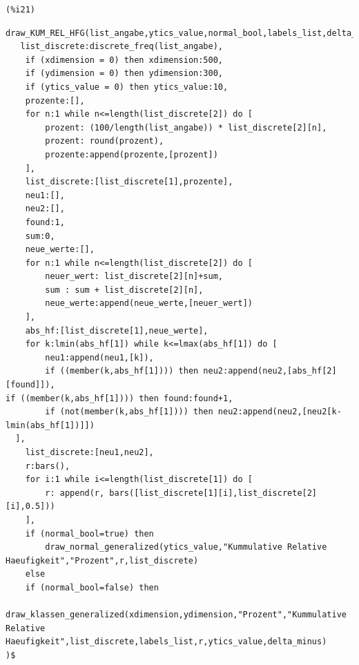 \documentclass[12pt]{article}
\begin{document}
\noindent
\begin{minipage}[t]{8ex}{\color{red}\bf
\begin{verbatim}
(%i21) 
\end{verbatim}}
\end{minipage}
\begin{minipage}[t]{\textwidth}{\color{blue}
\begin{verbatim}
draw_KUM_REL_HFG(list_angabe,ytics_value,normal_bool,labels_list,delta_minus,xdimension,ydimension):=block(
   list_discrete:discrete_freq(list_angabe),
    if (xdimension = 0) then xdimension:500,
    if (ydimension = 0) then ydimension:300,
    if (ytics_value = 0) then ytics_value:10,
    prozente:[],
    for n:1 while n<=length(list_discrete[2]) do [
        prozent: (100/length(list_angabe)) * list_discrete[2][n],
        prozent: round(prozent),
        prozente:append(prozente,[prozent])
    ],
    list_discrete:[list_discrete[1],prozente],
    neu1:[],
    neu2:[],
    found:1,
    sum:0,
    neue_werte:[],
    for n:1 while n<=length(list_discrete[2]) do [
        neuer_wert: list_discrete[2][n]+sum,
        sum : sum + list_discrete[2][n],
        neue_werte:append(neue_werte,[neuer_wert])
    ],
    abs_hf:[list_discrete[1],neue_werte],
    for k:lmin(abs_hf[1]) while k<=lmax(abs_hf[1]) do [
        neu1:append(neu1,[k]),
        if ((member(k,abs_hf[1]))) then neu2:append(neu2,[abs_hf[2][found]]),
if ((member(k,abs_hf[1]))) then found:found+1,
        if (not(member(k,abs_hf[1]))) then neu2:append(neu2,[neu2[k-lmin(abs_hf[1])]])
  ],  
    list_discrete:[neu1,neu2],
    r:bars(),
    for i:1 while i<=length(list_discrete[1]) do [
        r: append(r, bars([list_discrete[1][i],list_discrete[2][i],0.5]))
    ],
    if (normal_bool=true) then
        draw_normal_generalized(ytics_value,"Kummulative Relative Haeufigkeit","Prozent",r,list_discrete)
    else
    if (normal_bool=false) then
        draw_klassen_generalized(xdimension,ydimension,"Prozent","Kummulative Relative Haeufigkeit",list_discrete,labels_list,r,ytics_value,delta_minus)
)$
\end{verbatim}}
\end{minipage}
\end{document}
